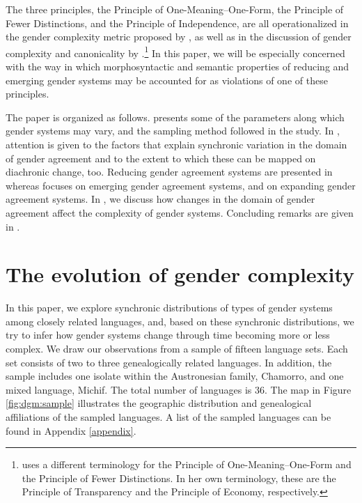 \documentclass[output=collectionpaper]{langsci/langscibook}
\begin{document}
The three principles, the Principle of One-Meaning–One-Form, the Principle of Fewer Distinctions, and the Principle of Independence, are all operationalized in the gender complexity metric proposed by \citet{DiGarbo2014,DiGarbo2016}, as well as in the discussion of gender complexity and canonicality by .\footnote{ uses a different terminology for the Principle of One-Meaning--One-Form and the Principle of Fewer Distinctions. In her own terminology, these are the Principle of Transparency and the Principle of Economy, respectively.} In this paper, we will be especially concerned with the way in which morphosyntactic and semantic properties of reducing and emerging gender systems may be accounted for as violations of one of these principles.

The paper is organized as follows.  presents some of the parameters along which gender systems may vary, and the sampling method followed in the study. In , attention is given to the factors that explain synchronic variation in the domain of gender agreement and to the extent to which these can be mapped on diachronic change, too. Reducing gender agreement systems are presented in  whereas  focuses on emerging gender agreement systems, and  on expanding gender agreement systems. In  , we discuss how changes in the domain of gender agreement affect the complexity of gender systems. Concluding remarks are given in .



\section{The evolution of gender complexity}
\label{sec:dgm:evolution}

In this paper, we explore synchronic distributions of types of gender systems among closely related languages, and, based on these synchronic distributions, we try to infer how gender systems change through time becoming more or less complex. We draw our observations from a sample of fifteen language sets. Each set consists of two to three genealogically related languages. In addition, the sample includes one isolate within the Austronesian family, Chamorro, and one mixed language, Michif. The total number of languages is 36. The map in Figure \ref{fig:dgm:sample} illustrates the geographic distribution and genealogical affiliations of the sampled languages. A list of the sampled languages can be found in Appendix \ref{appendix}.
\end{document}
